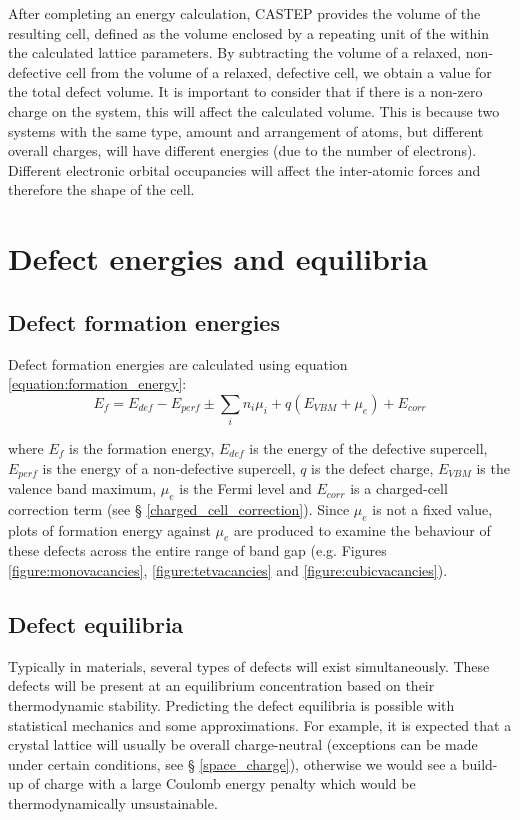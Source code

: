 After completing an energy calculation, CASTEP provides the volume of the resulting cell, defined as the volume enclosed by a repeating unit of the within the calculated lattice parameters. By subtracting the volume of a relaxed, non-defective cell from the volume of a relaxed, defective cell, we obtain a value for the total defect volume. It is important to consider that if there is a non-zero charge on the system, this will affect the calculated volume. This is because two systems with the same type, amount and arrangement of atoms, but different overall charges, will have different energies (due to the number of electrons). Different electronic orbital occupancies will affect the inter-atomic forces and therefore the shape of the cell. 

\section{Defect energies and equilibria} 

\subsection{Defect formation energies}

Defect formation energies are calculated using equation \ref{equation:formation_energy}:
\begin{equation} \label{equation:formation_energy}
    E_{f} = E_{def} - E_{perf} \pm \sum_{i} n_i\mu_i + q(E_{VBM} + \mu_{e}) + E_{corr}
\end{equation}

where $E_{f}$ is the formation energy, $E_{def}$ is the energy of the defective supercell, $E_{perf}$ is the energy of a non-defective supercell, $q$ is the defect charge, $E_{VBM}$ is the valence band maximum, $\mu_{e}$ is the Fermi level and $E_{corr}$ is a charged-cell correction term (see § \ref{charged_cell_correction}). Since $\mu_{e}$ is not a fixed value, plots of formation energy against $\mu_{e}$ are produced to examine the behaviour of these defects across the entire range of band gap (e.g. Figures \ref{figure:monovacancies}, \ref{figure:tetvacancies} and \ref{figure:cubicvacancies}).

\subsection{Defect equilibria} \label{brouwer_method} %

Typically in materials, several types of defects will exist simultaneously. These defects will be present at an equilibrium concentration based on their thermodynamic stability. Predicting the defect equilibria is possible with statistical mechanics and some approximations. For example, it is expected that a crystal lattice will usually be overall charge-neutral (exceptions can be made under certain conditions, see § \ref{space_charge}), otherwise we would see a build-up of charge with a large Coulomb energy penalty which would be thermodynamically unsustainable.

